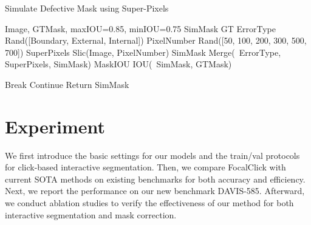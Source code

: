 \documentclass[10pt,twocolumn,letterpaper]{article}
\begin{document}
\begin{algorithm}[t]
    \small
	\caption{Simulate Defective Mask using Super-Pixels} 
	\label{alg1} 
	\small
	\begin{algorithmic}
		\REQUIRE Image, GTMask, maxIOU=0.85, minIOU=0.75
		\STATE SimMask  GT
		\WHILE{  } 
		\STATE ErrorType  Rand([Boundary, External, Internal])
		\STATE PixelNumber  Rand([50, 100, 200, 300, 500, 700])
		\STATE SuperPixels  Slic(Image, PixelNumber)
		\STATE SimMask  Merge(~ErrorType, SuperPixels, SimMask)
		\STATE MaskIOU  IOU(~SimMask, GTMask)
		
		\STATE Break
		\STATE Continue 
		\ELSE
		\STATE Return SimMask
		\ENDIF 
		\ENDWHILE 
	\end{algorithmic}
\end{algorithm}
\vspace{-3mm}




\begin{comment} 
\begin{figure}[t]
\newcommand{\image}{\includegraphics[width=0.99\columnwidth]}
\centering 
\tabcolsep=0.05cm
\renewcommand{\arraystretch}{0.06}
\begin{tabular}{c}


\image{Fig/interDavis/1.png} \\
\image{Fig/interDavis/2.png} \\
\image{Fig/interDavis/3.png} \\
\image{Fig/interDavis/4.png} 

\end{tabular}
\vspace{-3mm}
\caption{ Examples of our DAVIS-585 benchmark. From left to right represent the original image, the ground truth mask, and generated defective masks.  
}
\label{fig:interdavis}
\vspace{-2mm}
\end{figure}
\end{comment}







\section{Experiment}

We first introduce the basic settings for our models and the train/val protocols for click-based interactive segmentation. Then, we compare FocalClick with current SOTA methods on existing benchmarks for both accuracy and efficiency.  Next, we report the performance on our new benchmark DAVIS-585. Afterward, we conduct ablation studies to verify the effectiveness of our method for both interactive segmentation and mask correction.  
\end{document}
